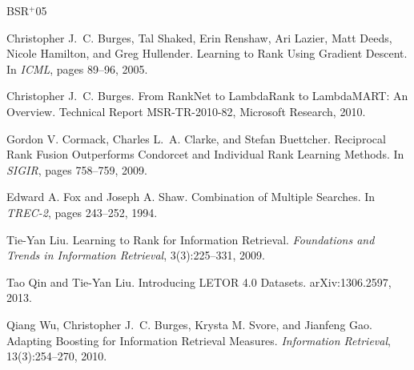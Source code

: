 \documentclass[10pt]{article}
\begin{document}
\providecommand{\etalchar}[1]{$^{#1}$}
\begin{thebibliography}{BSR{\etalchar{+}}05}

\bibitem[BSR{\etalchar{+}}05]{burges2005}
Christopher J.~C. Burges, Tal Shaked, Erin Renshaw, Ari Lazier, Matt Deeds, Nicole Hamilton, and Greg Hullender.
\newblock Learning to Rank Using Gradient Descent.
\newblock In \emph{ICML}, pages 89--96, 2005.

Christopher J.~C. Burges.
\newblock From RankNet to LambdaRank to LambdaMART: An Overview.
\newblock Technical Report MSR-TR-2010-82, Microsoft Research, 2010.

Gordon V. Cormack, Charles L.~A. Clarke, and Stefan Buettcher.
\newblock Reciprocal Rank Fusion Outperforms Condorcet and Individual Rank Learning Methods.
\newblock In \emph{SIGIR}, pages 758--759, 2009.

Edward A. Fox and Joseph A. Shaw.
\newblock Combination of Multiple Searches.
\newblock In \emph{TREC-2}, pages 243--252, 1994.

Tie-Yan Liu.
\newblock Learning to Rank for Information Retrieval.
\newblock \emph{Foundations and Trends in Information Retrieval}, 3(3):225--331, 2009.

Tao Qin and Tie-Yan Liu.
\newblock Introducing LETOR 4.0 Datasets.
\newblock arXiv:1306.2597, 2013.

Qiang Wu, Christopher J.~C. Burges, Krysta M. Svore, and Jianfeng Gao.
\newblock Adapting Boosting for Information Retrieval Measures.
\newblock \emph{Information Retrieval}, 13(3):254--270, 2010.

\end{thebibliography}
\end{document}
